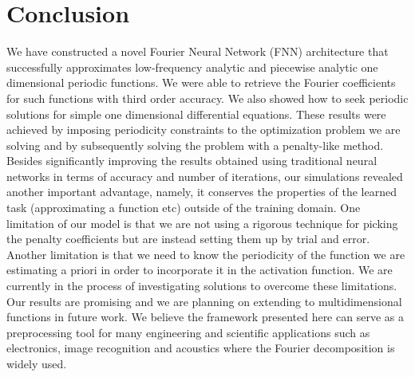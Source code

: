 \documentclass[AMS,STIX1COL]{WileyNJD-v2}
\begin{document}





\section{Conclusion}
We have constructed a novel Fourier Neural Network (FNN) architecture that successfully approximates low-frequency analytic and piecewise analytic one dimensional periodic functions. We were able to retrieve the Fourier coefficients for such functions with third order accuracy. We also showed how to seek periodic solutions for simple one dimensional differential equations. These results were achieved by imposing periodicity constraints to the optimization problem we are solving and by subsequently solving the problem with a penalty-like method. Besides significantly improving the results obtained using traditional neural networks in terms of accuracy and number of iterations, our simulations revealed another important advantage, namely, it conserves the properties of the learned task (approximating a function etc) outside of the training domain. One limitation of our model is that we are not using a rigorous technique for picking the penalty coefficients but are instead setting them up by trial and error. Another limitation is that we need to know the periodicity of the function we are estimating a priori in order to incorporate it in the activation function. We are currently in the process of investigating solutions to overcome these limitations. Our results are promising and we are planning on extending to multidimensional functions in future work. We believe the framework presented here can serve as a preprocessing tool for many engineering and scientific applications such as electronics, image recognition and acoustics where the Fourier decomposition is widely used.
\end{document}
